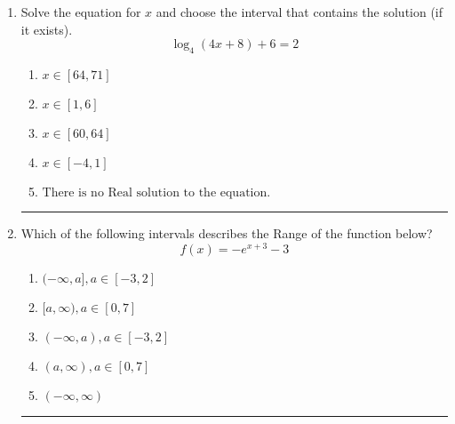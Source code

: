 \documentclass[14pt]{extbook}
\newcommand{\litem}[1]{\item#1\hspace*{-1cm}\rule{\textwidth}{0.4pt}}
\begin{document}
\begin{enumerate}
{\begin{enumerate}[label=\Alph*.]
\end{enumerate} }
\litem{
Solve the equation for $x$ and choose the interval that contains the solution (if it exists).\[ \log_{4}{(4x+8)}+6 = 2 \]\begin{enumerate}[label=\Alph*.]
\item \( x \in [64, 71] \)
\item \( x \in [1, 6] \)
\item \( x \in [60, 64] \)
\item \( x \in [-4, 1] \)
\item \( \text{There is no Real solution to the equation.} \)

\end{enumerate} }
\litem{
Which of the following intervals describes the Range of the function below?\[ f(x) = -e^{x+3}-3 \]\begin{enumerate}[label=\Alph*.]
\item \( (-\infty, a], a \in [-3, 2] \)
\item \( [a, \infty), a \in [0, 7] \)
\item \( (-\infty, a), a \in [-3, 2] \)
\item \( (a, \infty), a \in [0, 7] \)
\item \( (-\infty, \infty) \)

\end{enumerate} }
\end{enumerate}
\end{document}
